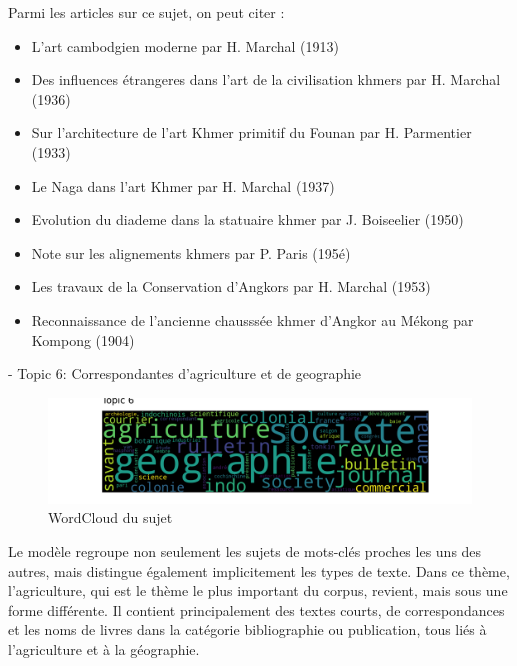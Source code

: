 Parmi les articles sur ce sujet, on peut citer :
\begin{itemize}
    \item 
L'art cambodgien moderne par H. Marchal (1913)

    \item 
Des influences étrangeres dans l'art de la civilisation khmers par H. Marchal (1936)

    \item 
Sur l'architecture de l'art Khmer primitif du Founan par H. Parmentier (1933)

    \item 
Le Naga dans l'art Khmer par H. Marchal (1937)

    \item 
Evolution du diademe dans la statuaire khmer par J. Boiseelier (1950)

    \item 
Note sur les alignements khmers par P. Paris (195é)

    \item 
Les travaux de la Conservation d'Angkors par H. Marchal (1953)

    \item 
Reconnaissance de l'ancienne chausssée khmer d'Angkor au Mékong par Kompong (1904)
\end{itemize}

- Topic 6: Correspondantes d'agriculture et de geographie

\begin{figure}[H] %
    \centering
    \includegraphics[width=14cm]{img/final_6_topic 6 .png}
    \caption{WordCloud du sujet }
    \label{tp6}
\end{figure}

Le modèle regroupe non seulement les sujets de mots-clés proches les uns des autres, mais distingue également implicitement les types de texte. Dans ce thème, l'agriculture, qui est le thème le plus important du corpus, revient, mais sous une forme différente. Il contient principalement des textes courts, de correspondances et les noms de livres dans la catégorie bibliographie ou publication, tous liés à l'agriculture et à la géographie.

